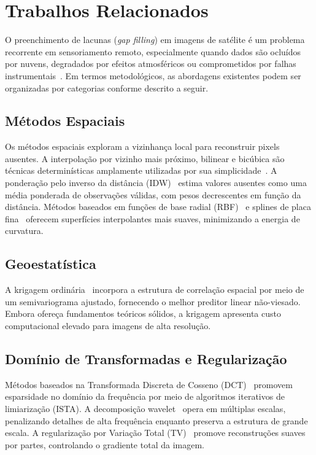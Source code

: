 \section{Trabalhos Relacionados}
\label{sec:related}

O preenchimento de lacunas (\emph{gap filling}) em imagens de satélite é um problema recorrente em sensoriamento remoto, especialmente quando dados são ocluídos por nuvens, degradados por efeitos atmosféricos ou comprometidos por falhas instrumentais~\cite{shen2015missing}.
Em termos metodológicos, as abordagens existentes podem ser organizadas por categorias conforme descrito a seguir.

\subsection{Métodos Espaciais}

Os métodos espaciais exploram a vizinhança local para reconstruir pixels ausentes. A interpolação por vizinho mais próximo, bilinear e bicúbica são técnicas determinísticas amplamente utilizadas por sua simplicidade~\cite{deboor1978practical}. A ponderação pelo inverso da distância (IDW)~\cite{shepard1968two} estima valores ausentes como uma média ponderada de observações válidas, com pesos decrescentes em função da distância. Métodos baseados em funções de base radial (RBF)~\cite{buhmann2003radial} e splines de placa fina~\cite{duchon1977splines} oferecem superfícies interpolantes mais suaves, minimizando a energia de curvatura.

\subsection{Geoestatística}

A krigagem ordinária~\cite{cressie1993statistics,matheron1963principles} incorpora a estrutura de correlação espacial por meio de um semivariograma ajustado, fornecendo o melhor preditor linear não-viesado. Embora ofereça fundamentos teóricos sólidos, a krigagem apresenta custo computacional elevado para imagens de alta resolução.

\subsection{Domínio de Transformadas e Regularização}

Métodos baseados na Transformada Discreta de Cosseno (DCT)~\cite{ahmed1974discrete} promovem esparsidade no domínio da frequência por meio de algoritmos iterativos de limiarização (ISTA). A decomposição wavelet~\cite{mallat1989theory,daubechies1988orthonormal} opera em múltiplas escalas, penalizando detalhes de alta frequência enquanto preserva a estrutura de grande escala. A regularização por Variação Total (TV)~\cite{rudin1992nonlinear} promove reconstruções suaves por partes, controlando o gradiente total da imagem.

